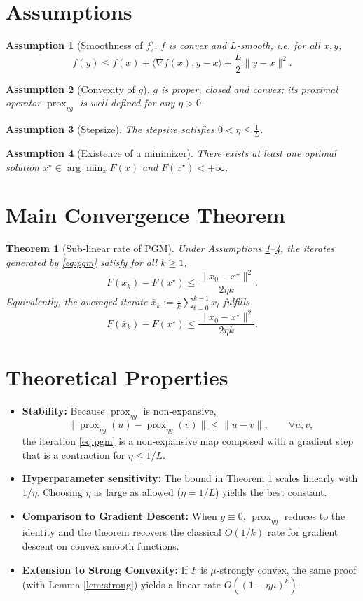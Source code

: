 \documentclass{article}
\newtheorem{theorem}{Theorem}
\newtheorem{assumption}{Assumption}
\newcommand{\prox}{\operatorname{prox}}
\newcommand{\grad}{\nabla}
\begin{document}
\newpage
\section*{Assumptions}
\begin{assumption}[Smoothness of $f$]\label{ass:smooth}
$f$ is convex and $L$‑smooth, i.e. for all $x,y$,
\[
f(y)\le f(x)+\langle \grad f(x),y-x\rangle+\frac{L}{2}\|y-x\|^{2}.
\]
\end{assumption}
\begin{assumption}[Convexity of $g$]\label{ass:gconv}
$g$ is proper, closed and convex; its proximal operator $\prox_{\eta g}$ is well defined for any $\eta>0$.
\end{assumption}
\begin{assumption}[Stepsize]\label{ass:stepsize}
The stepsize satisfies $0<\eta\le \frac{1}{L}$.
\end{assumption}
\begin{assumption}[Existence of a minimizer]\label{ass:opt}
There exists at least one optimal solution $x^{\star}\in\arg\min_{x}F(x)$ and $F(x^{\star})<+\infty$.
\end{assumption}

\section*{Main Convergence Theorem}
\begin{theorem}[Sub‑linear rate of PGM]\label{thm:sublinear}
Under Assumptions \ref{ass:smooth}–\ref{ass:opt}, the iterates generated by \eqref{eq:pgm} satisfy for all $k\ge 1$,
\[
F(x_{k})-F(x^{\star})\le \frac{\|x_{0}-x^{\star}\|^{2}}{2\eta k}.
\]
Equivalently, the averaged iterate $\bar x_{k}:=\frac1k\sum_{t=0}^{k-1}x_{t}$ fulfills
\[
F(\bar x_{k})-F(x^{\star})\le \frac{\|x_{0}-x^{\star}\|^{2}}{2\eta k}.
\]
\end{theorem}

\section*{Theoretical Properties}
\begin{itemize}
\item \textbf{Stability:} Because $\prox_{\eta g}$ is non‑expansive,
\[
\|\prox_{\eta g}(u)-\prox_{\eta g}(v)\|\le\|u-v\|,\qquad\forall u,v,
\]
the iteration \eqref{eq:pgm} is a non‑expansive map composed with a gradient step that is a contraction for $\eta\le 1/L$.
\item \textbf{Hyperparameter sensitivity:} The bound in Theorem \ref{thm:sublinear} scales linearly with $1/\eta$. Choosing $\eta$ as large as allowed ($\eta=1/L$) yields the best constant.
\item \textbf{Comparison to Gradient Descent:} When $g\equiv0$, $\prox_{\eta g}$ reduces to the identity and the theorem recovers the classical $O(1/k)$ rate for gradient descent on convex smooth functions.
\item \textbf{Extension to Strong Convexity:} If $F$ is $\mu$‑strongly convex, the same proof (with Lemma \ref{lem:strong}) yields a linear rate $O((1-\eta\mu)^{k})$.
\end{itemize}
\end{document}

